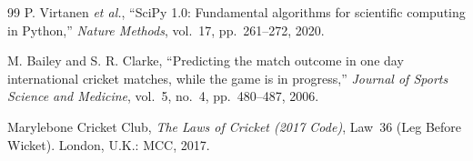 \documentclass[journal]{IEEEtran}
\begin{document}
\begin{thebibliography}{99}
P. Virtanen \emph{et al.}, ``SciPy 1.0: Fundamental algorithms for scientific
computing in Python,'' \emph{Nature Methods}, vol.~17, pp.~261--272, 2020.

M. Bailey and S. R. Clarke, ``Predicting the match outcome in one day
international cricket matches, while the game is in progress,''
\emph{Journal of Sports Science and Medicine}, vol.~5, no.~4, pp.~480--487, 2006.

Marylebone Cricket Club, \emph{The Laws of Cricket (2017 Code)}, Law~36
(Leg Before Wicket). London, U.K.: MCC, 2017.

\end{thebibliography}
\end{document}
